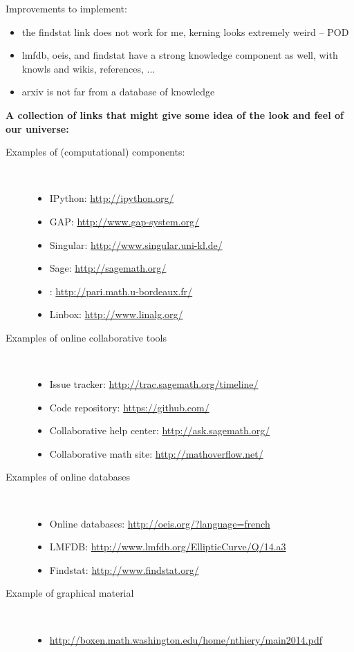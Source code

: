 {\begin{description}
\begin{description}
    \end{description}
  \end{description}
  Improvements to implement:
  \begin{itemize}
  \item the findstat link does not work for me, kerning looks
    extremely weird -- POD
  \item lmfdb, oeis, and findstat have a strong knowledge component as
    well, with knowls and wikis, references, ...
  \item arxiv is not far from a database of knowledge
  \end{itemize}
  \textbf{\Large A collection of links that might give some idea of
    the look and feel of our universe:}
  \begin{description}
  \item[Examples of (computational) components:]\ 
    \begin{itemize}
    \item IPython: \url{http://ipython.org/}
    \item GAP: \url{http://www.gap-system.org/}
    \item Singular: \url{http://www.singular.uni-kl.de/}
    \item Sage: \url{http://sagemath.org/}
    \item \PariGP: \url{http://pari.math.u-bordeaux.fr/}
    \item Linbox: \url{http://www.linalg.org/}
    \end{itemize}
  \item[Examples of online collaborative tools]\ 
    \begin{itemize}
    \item Issue tracker: \url{http://trac.sagemath.org/timeline/}
    \item Code repository: \url{https://github.com/}
    \item Collaborative help center: \url{http://ask.sagemath.org/}
    \item Collaborative math site: \url{http://mathoverflow.net/}
    \end{itemize}
  \item[Examples of online databases]\ 
    \begin{itemize}
    \item Online databases: \url{http://oeis.org/?language=french}
    \item LMFDB: \url{http://www.lmfdb.org/EllipticCurve/Q/14.a3}
    \item Findstat: \url{http://www.findstat.org/}
    \end{itemize}
  \item[Example of graphical material]\ 
    \begin{itemize}
    \item \url{http://boxen.math.washington.edu/home/nthiery/main2014.pdf}
    \end{itemize}
  \end{description}
}

